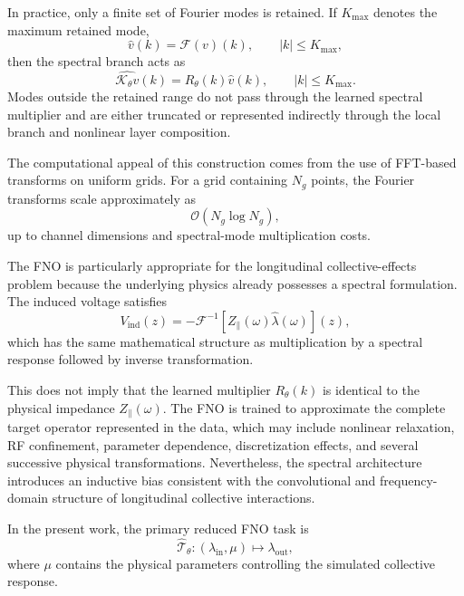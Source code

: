 \documentclass[11pt,a4paper]{article}
\begin{document}
\begin{sloppypar}
In practice, only a finite set of Fourier modes is retained. If $K_{\max}$ denotes the maximum retained mode,
\begin{equation}
\widehat{v}(k)
=
\mathcal{F}(v)(k),
\qquad
|k|
\le
K_{\max},
\end{equation}
then the spectral branch acts as
\begin{equation}
\widehat{\mathcal{K}_{\theta}v}(k)
=
R_{\theta}(k)
\widehat{v}(k),
\qquad
|k|
\le
K_{\max}.
\label{eq:fno_mode_truncation}
\end{equation}
Modes outside the retained range do not pass through the learned spectral multiplier and are either truncated or represented indirectly through the local branch and nonlinear layer composition.

The computational appeal of this construction comes from the use of FFT-based transforms on uniform grids. For a grid containing $N_g$ points, the Fourier transforms scale approximately as
\begin{equation}
\mathcal{O}
\left(
N_g\log N_g
\right),
\end{equation}
up to channel dimensions and spectral-mode multiplication costs.

The FNO is particularly appropriate for the longitudinal collective-effects problem because the underlying physics already possesses a spectral formulation. The induced voltage satisfies
\begin{equation}
V_{\mathrm{ind}}(z)
=
-
\mathcal{F}^{-1}
\left[
Z_{\parallel}(\omega)
\widehat{\lambda}(\omega)
\right](z),
\label{eq:fno_induced_voltage_relation}
\end{equation}
which has the same mathematical structure as multiplication by a spectral response followed by inverse transformation.

This does not imply that the learned multiplier $R_{\theta}(k)$ is identical to the physical impedance $Z_{\parallel}(\omega)$. The FNO is trained to approximate the complete target operator represented in the data, which may include nonlinear relaxation, RF confinement, parameter dependence, discretization effects, and several successive physical transformations. Nevertheless, the spectral architecture introduces an inductive bias consistent with the convolutional and frequency-domain structure of longitudinal collective interactions.

In the present work, the primary reduced FNO task is
\begin{equation}
\widehat{\mathcal{T}}_{\theta}
:
(\lambda_{\mathrm{in}},\mu)
\longmapsto
\lambda_{\mathrm{out}},
\label{eq:fno_main_task}
\end{equation}
where $\mu$ contains the physical parameters controlling the simulated collective response.


\end{sloppypar}
\end{document}
